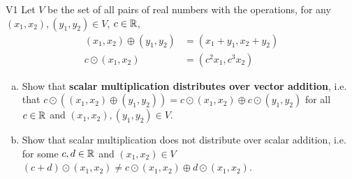  \begin{problem}{V1}
 Let \(V\) be the set of all pairs of real numbers with the operations, for any \((x_1,x_2), (y_1,y_2) \in V\), \(c\in \mathbb{R}\),
 \begin{align*}
 (x_1,x_2) \oplus (y_1,y_2) &= (x_1+y_1,x_2+y_2) \\
 c \odot (x_1,x_2) &= (c^2x_1, c^3x_2)
 \end{align*}
 \begin{enumerate}[(a)]
 \item Show that \textbf{scalar multiplication distributes over
       vector addition}, i.e. that
       \(c\odot((x_1,x_2) \oplus (y_1,y_2))=
       c\odot(x_1,x_2) \oplus c\odot(y_1,y_2)\) for all \(c \in \mathbb{R}\) and \( (x_1,x_2), (y_1,y_2) \in V\).
 \item Show that scalar multiplication does not distribute over
       scalar addition, i.e. for some \(c,d \in \mathbb{R}\) and \( (x_1,x_2)\in V\)
       \((c+d)\odot(x_1,x_2)\neq c\odot(x_1,x_2) \oplus d\odot(x_1,x_2)\).
 \end{enumerate}
\end{problem}
%
%
%
%
